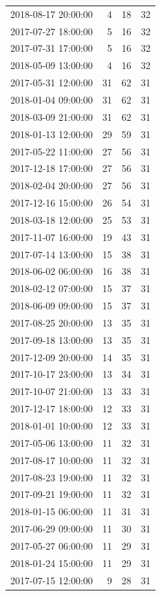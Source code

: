 \begin{tabular}{lrrr}
2018-08-17 20:00:00 & 4 & 18 & 32 \\
2017-07-27 18:00:00 & 5 & 16 & 32 \\
2017-07-31 17:00:00 & 5 & 16 & 32 \\
2018-05-09 13:00:00 & 4 & 16 & 32 \\
2017-05-31 12:00:00 & 31 & 62 & 31 \\
2018-01-04 09:00:00 & 31 & 62 & 31 \\
2018-03-09 21:00:00 & 31 & 62 & 31 \\
2018-01-13 12:00:00 & 29 & 59 & 31 \\
2017-05-22 11:00:00 & 27 & 56 & 31 \\
2017-12-18 17:00:00 & 27 & 56 & 31 \\
2018-02-04 20:00:00 & 27 & 56 & 31 \\
2017-12-16 15:00:00 & 26 & 54 & 31 \\
2018-03-18 12:00:00 & 25 & 53 & 31 \\
2017-11-07 16:00:00 & 19 & 43 & 31 \\
2017-07-14 13:00:00 & 15 & 38 & 31 \\
2018-06-02 06:00:00 & 16 & 38 & 31 \\
2018-02-12 07:00:00 & 15 & 37 & 31 \\
2018-06-09 09:00:00 & 15 & 37 & 31 \\
2017-08-25 20:00:00 & 13 & 35 & 31 \\
2017-09-18 13:00:00 & 13 & 35 & 31 \\
2017-12-09 20:00:00 & 14 & 35 & 31 \\
2017-10-17 23:00:00 & 13 & 34 & 31 \\
2017-10-07 21:00:00 & 13 & 33 & 31 \\
2017-12-17 18:00:00 & 12 & 33 & 31 \\
2018-01-01 10:00:00 & 12 & 33 & 31 \\
2017-05-06 13:00:00 & 11 & 32 & 31 \\
2017-08-17 10:00:00 & 11 & 32 & 31 \\
2017-08-23 19:00:00 & 11 & 32 & 31 \\
2017-09-21 19:00:00 & 11 & 32 & 31 \\
2018-01-15 06:00:00 & 11 & 31 & 31 \\
2017-06-29 09:00:00 & 11 & 30 & 31 \\
2017-05-27 06:00:00 & 11 & 29 & 31 \\
2018-01-24 15:00:00 & 11 & 29 & 31 \\
2017-07-15 12:00:00 & 9 & 28 & 31 \\

\end{tabular}
